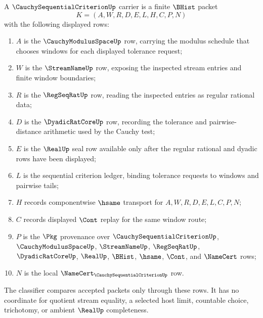 \begin{definition}
\label{def:cauchy-sequential-criterion-carrier}
A $\CauchySequentialCriterionUp$ carrier is a finite $\BHist$ packet
$$
K=(A,W,R,D,E,L,H,C,P,N)
$$
with the following displayed rows:
\begin{enumerate}
\item $A$ is the $\CauchyModulusSpaceUp$ row, carrying the modulus schedule that chooses windows for each displayed tolerance request;
\item $W$ is the $\StreamNameUp$ row, exposing the inspected stream entries and finite window boundaries;
\item $R$ is the $\RegSeqRatUp$ row, reading the inspected entries as regular rational data;
\item $D$ is the $\DyadicRatCoreUp$ row, recording the tolerance and pairwise-distance arithmetic used by the Cauchy test;
\item $E$ is the $\RealUp$ seal row available only after the regular rational and dyadic rows have been displayed;
\item $L$ is the sequential criterion ledger, binding tolerance requests to windows and pairwise tails;
\item $H$ records componentwise $\hsame$ transport for $A,W,R,D,E,L,C,P,N$;
\item $C$ records displayed $\Cont$ replay for the same window route;
\item $P$ is the $\Pkg$ provenance over $\CauchySequentialCriterionUp$, $\CauchyModulusSpaceUp$, $\StreamNameUp$, $\RegSeqRatUp$, $\DyadicRatCoreUp$, $\RealUp$, $\BHist$, $\hsame$, $\Cont$, and $\NameCert$ rows;
\item $N$ is the local $\NameCert_{\CauchySequentialCriterionUp}$ row.
\end{enumerate}
The classifier compares accepted packets only through these rows. It has no coordinate for quotient stream equality, a selected host limit, countable choice, trichotomy, or ambient $\RealUp$ completeness.
\end{definition}

